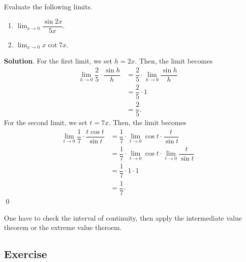 \documentclass[11pt]{book}
\theoremstyle{break}
\theoremstyle{no_label}
\numberwithin{equation}{section}
\begin{document}
\begin{example}
    Evaluate the following limits.
    \begin{enumerate}
        \item $\displaystyle\lim_{x\to 0}\dfrac{\sin 2x}{5x}$.
        \item $\displaystyle\lim_{x\to 0}x\cot7x$.
    \end{enumerate}
\end{example}
\textbf{Solution}. For the first limit, we set $h=2x$. Then, the limit becomes \begin{align*}
    \lim_{h\to 0}\dfrac{2}{5}\cdot\dfrac{\sin h}{h}&=\dfrac{2}{5}\cdot\lim_{h\to 0}\dfrac{\sin h}{h}\\
    &=\dfrac{2}{5}\cdot1\\
    &=\dfrac{2}{5}.
\end{align*} For the second limit, we set $t=7x$. Then, the limit becomes \begin{align*}
    \lim_{t\to 0}\dfrac{1}{7}\cdot\dfrac{t\cos t}{\sin t}&=\dfrac{1}{7}\cdot\lim_{t\to 0}\cos t\cdot\dfrac{t}{\sin t}\\
    &=\dfrac{1}{7}\cdot\lim_{t\to 0}\cos t\cdot\lim_{t\to 0}\dfrac{t}{\sin t}\\
    &=\dfrac{1}{7}\cdot1\cdot1\\
    &=\dfrac{1}{7}.
\end{align*} \qed

\begin{remark}
    One have to check the interval of continuity, then apply the intermediate value theorem or the extreme value theroem.
\end{remark}

\subsection*{Exercise}
\end{document}
